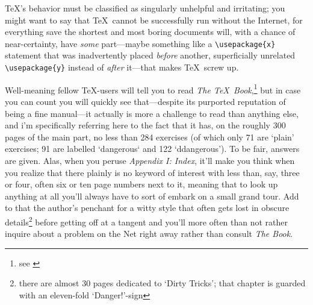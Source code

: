 \TeX's behavior must be classified as singularly unhelpful and
irritating; you might want to say that \TeX\ cannot be successfully run without the Internet, for everything
save the shortest and most boring documents will, with a chance of near-certainty, have
{\em some} part---maybe something like a \verb#\usepackage{x}# statement that was inadvertently placed {\em
before} another, superficially unrelated \verb#\usepackage{y}# instead of {\em after} it---that makes \TeX\
screw up.

Well-meaning fellow \TeX-users will tell you to read {\em The \TeX\ Book},\footnote{see \cite{thebook}} but
in case you can count you will quickly see that---despite its purported reputation of being a fine
manual---it actually is more a challenge to read than anything else, and i'm specifically referring here to the fact
that it has, on the roughly 300 pages of the main part, no less than 284 exercises (of which only 71 are
`plain' exercises; 91 are labelled `dangerous` and 122 `ddangerous'). To be fair, answers are given. Alas,
when you peruse {\em Appendix I: Index}, it'll make you think when you realize that there plainly is no
keyword of interest with less than, say, three or four, often six or ten page numbers next to it, meaning
that to look up anything at all you'll always have to sort of embark on a small grand tour. Add to that the
author's penchant for a witty style that often gets lost in obscure details\footnote{there are almost 30
pages dedicated to `Dirty Tricks'; that chapter is guarded with an eleven-fold `Danger!'-sign} before
getting off at a tangent and you'll more often than not rather inquire about a problem on the Net right away
rather than consult {\em The Book}.

